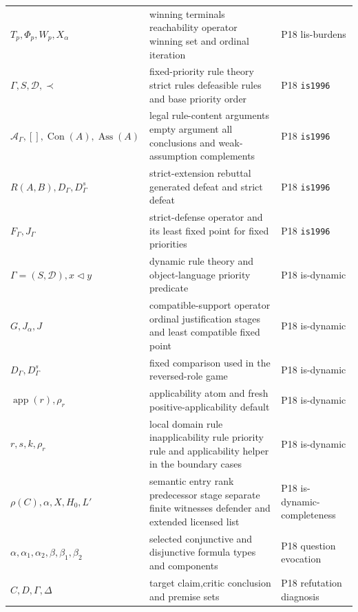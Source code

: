 \begin{longtable}{@{}p{}p{}p{}@{}}
\(T_p,\allowbreak \Phi_p,\allowbreak W_p,\allowbreak X_\alpha\) & winning terminals reachability operator winning set and ordinal iteration & P18 lis-\allowbreak{}burdens \\
\(\Gamma,\allowbreak S,\allowbreak \mathcal D,\allowbreak \prec\) & fixed-priority rule theory strict rules defeasible rules and base priority order & P18 \texttt{is1996} \\
\(\mathcal A_\Gamma,\allowbreak [],\allowbreak \operatorname{Con}(A),\allowbreak \operatorname{Ass}(A)\) & legal rule-content arguments empty argument all conclusions and weak-assumption complements & P18 \texttt{is1996} \\
\(R(A,\allowbreak B),\allowbreak D_\Gamma,\allowbreak D_\Gamma^s\) & strict-extension rebuttal generated defeat and strict defeat & P18 \texttt{is1996} \\
\(F_\Gamma,\allowbreak J_\Gamma\) & strict-defense operator and its least fixed point for fixed priorities & P18 \texttt{is1996} \\
\(\Gamma=(S,\allowbreak \mathcal D),\allowbreak x\triangleleft y\) & dynamic rule theory and object-language priority predicate & P18 is-\allowbreak{}dynamic \\
\(G,\allowbreak J_\alpha,\allowbreak J\) & compatible-support operator ordinal justification stages and least compatible fixed point & P18 is-\allowbreak{}dynamic \\
\(D_\Gamma,\allowbreak D_\Gamma^s\) & fixed comparison used in the reversed-role game & P18 is-\allowbreak{}dynamic \\
\(\operatorname{app}(r),\allowbreak \rho_r\) & applicability atom and fresh positive-applicability default & P18 is-\allowbreak{}dynamic \\
\(r,\allowbreak s,\allowbreak k,\allowbreak \rho_r\) & local domain rule inapplicability rule priority rule and applicability helper in the boundary cases & P18 is-\allowbreak{}dynamic \\
\(\rho(C),\allowbreak \alpha,\allowbreak X,\allowbreak H_0,\allowbreak L'\) & semantic entry rank predecessor stage separate finite witnesses defender and extended licensed list & P18 is-\allowbreak{}dynamic-\allowbreak{}completeness \\
\(\alpha,\allowbreak \alpha_1,\allowbreak \alpha_2,\allowbreak \beta,\allowbreak \beta_1,\allowbreak \beta_2\) & selected conjunctive and disjunctive formula types and components & P18 question evocation \\
\(C,\allowbreak D,\allowbreak \Gamma,\allowbreak \Delta\) & target claim,critic conclusion and premise sets & P18 refutation diagnosis \\

\end{longtable}
